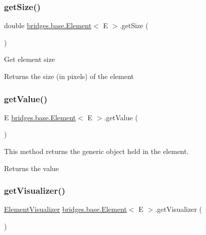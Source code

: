 \subsubsection{\texorpdfstring{get\+Size()}{getSize()}}
{\footnotesize\ttfamily double \hyperlink{classbridges_1_1base_1_1_element}{bridges.\+base.\+Element}$<$ E $>$.get\+Size (\begin{DoxyParamCaption}{ }\end{DoxyParamCaption})}

Get element size \begin{DoxyReturn}{Returns}
the size (in pixels) of the element 
\end{DoxyReturn}
\mbox{\label{classbridges_1_1base_1_1_element_a44ddc61db34b6cf0bab7dfba667d54af}} 
\subsubsection{\texorpdfstring{get\+Value()}{getValue()}}
{\footnotesize\ttfamily E \hyperlink{classbridges_1_1base_1_1_element}{bridges.\+base.\+Element}$<$ E $>$.get\+Value (\begin{DoxyParamCaption}{ }\end{DoxyParamCaption})}

This method returns the generic object held in the element.

\begin{DoxyReturn}{Returns}
the value 
\end{DoxyReturn}
\mbox{\label{classbridges_1_1base_1_1_element_a42c84d41dfb7bd05a586e303cb33de72}} 
\subsubsection{\texorpdfstring{get\+Visualizer()}{getVisualizer()}}
{\footnotesize\ttfamily \hyperlink{classbridges_1_1base_1_1_element_visualizer}{Element\+Visualizer} \hyperlink{classbridges_1_1base_1_1_element}{bridges.\+base.\+Element}$<$ E $>$.get\+Visualizer (\begin{DoxyParamCaption}{ }\end{DoxyParamCaption})}

